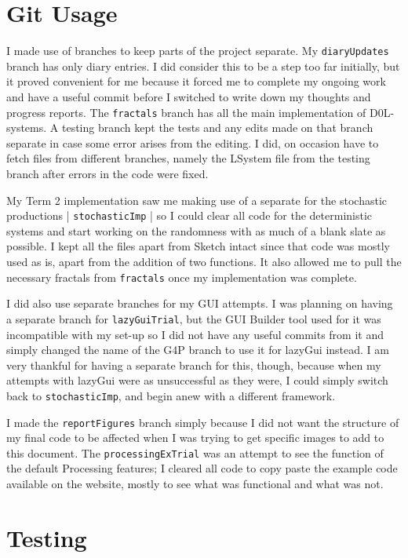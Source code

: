\documentclass[]{final_report}
\begin{document}
\section{Git Usage}

I made use of branches to keep parts of the project separate. My \verb|diaryUpdates| branch has only diary entries. I did consider this to be a step too far initially, but it proved convenient for me because it forced me to complete my ongoing work and have a useful commit before I switched to write down my thoughts and progress reports. The \verb|fractals| branch has all the main implementation of D0L-systems. A testing branch kept the tests and any edits made on that branch separate in case some error arises from the editing. I did, on occasion have to fetch files from different branches, namely the LSystem file from the testing branch after errors in the code were fixed. 

My Term 2 implementation saw me making use of a separate for the stochastic productions | \verb|stochasticImp| | so I could clear all code for the deterministic systems and start working on the randomness with as much of a blank slate as possible. I kept all the files apart from Sketch intact since that code was mostly used as is, apart from the addition of two functions. It also allowed me to pull the necessary fractals from \verb|fractals| once my implementation was complete. 

I did also use separate branches for my GUI attempts. I was planning on having a separate branch for \verb|lazyGuiTrial|, but the GUI Builder tool used for it was incompatible with my set-up so I did not have any useful commits from it and simply changed the name of the G4P branch to use it for lazyGui instead. I am very thankful for having a separate branch for this, though, because when my attempts with lazyGui were as unsuccessful as they were, I could simply switch back to \verb|stochasticImp|, and begin anew with a different framework.

I made the \verb|reportFigures| branch simply because I did not want the structure of my final code to be affected when I was trying to get specific images to add to this document. The \verb|processingExTrial| was an attempt to see the function of the default Processing features; I cleared all code to copy paste the example code available on the website, mostly to see what was functional and what was not.

\section{Testing}
\end{document}
